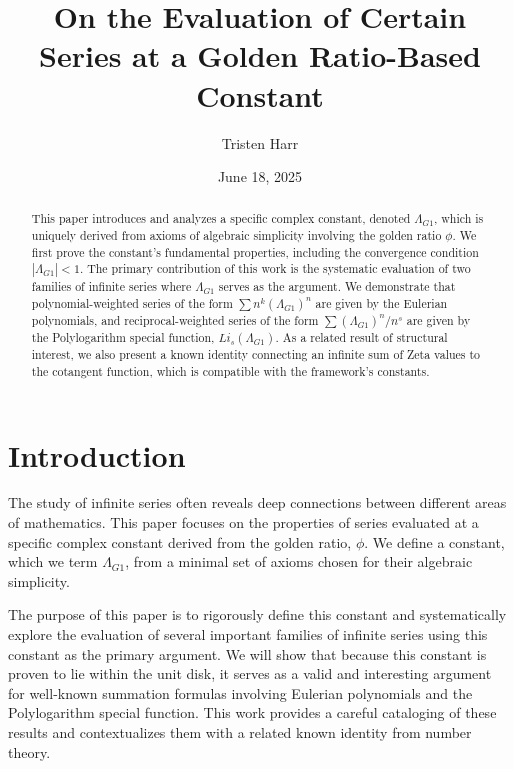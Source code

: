\documentclass{amsart}
\theoremstyle{plain}
\theoremstyle{definition}
\theoremstyle{remark}
\newcommand{\LambdaG}{\Lambda_{G1}}
\begin{document}
\title[Series Evaluations at a Golden Ratio Constant]{On the Evaluation of Certain Series at a Golden Ratio-Based Constant}
\author{Tristen Harr}
\date{June 18, 2025}
\address{Saint Charles, Missouri, United States}

\begin{abstract}
This paper introduces and analyzes a specific complex constant, denoted $\Lambda_{G1}$, which is uniquely derived from axioms of algebraic simplicity involving the golden ratio $\phi$. We first prove the constant's fundamental properties, including the convergence condition $|\Lambda_{G1}| < 1$. The primary contribution of this work is the systematic evaluation of two families of infinite series where $\Lambda_{G1}$ serves as the argument. We demonstrate that polynomial-weighted series of the form $\sum n^k (\LambdaG)^n$ are given by the Eulerian polynomials, and reciprocal-weighted series of the form $\sum (\LambdaG)^n / n^s$ are given by the Polylogarithm special function, $Li_s(\LambdaG)$. As a related result of structural interest, we also present a known identity connecting an infinite sum of Zeta values to the cotangent function, which is compatible with the framework's constants.
\end{abstract}

\maketitle

\section{Introduction}
The study of infinite series often reveals deep connections between different areas of mathematics. This paper focuses on the properties of series evaluated at a specific complex constant derived from the golden ratio, $\phi$. We define a constant, which we term $\Lambda_{G1}$, from a minimal set of axioms chosen for their algebraic simplicity.

The purpose of this paper is to rigorously define this constant and systematically explore the evaluation of several important families of infinite series using this constant as the primary argument. We will show that because this constant is proven to lie within the unit disk, it serves as a valid and interesting argument for well-known summation formulas involving Eulerian polynomials and the Polylogarithm special function. This work provides a careful cataloging of these results and contextualizes them with a related known identity from number theory.
\end{document}
